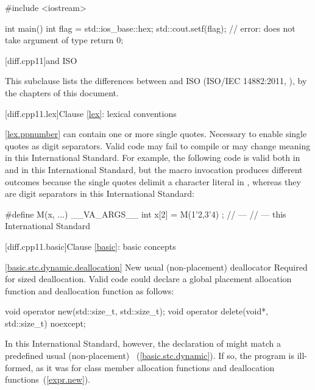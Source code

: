 \begin{codeblock}
#include <iostream>

int main() {
  int flag = std::ios_base::hex;
  std::cout.setf(flag);         // error:  does not take argument of type 
  return 0;
}
\end{codeblock}

[diff.cpp11]{\Cpp and ISO \CppXI}

\pnum
{}%
This subclause lists the differences between \Cpp and
ISO \CppXI (ISO/IEC 14882:2011, ),
by the chapters of this document.

[diff.cpp11.lex]{Clause \ref{lex}: lexical conventions}

\ref{lex.ppnumber}
\change {} can contain one or more single quotes.
\rationale Necessary to enable single quotes as digit separators.
\effect Valid \CppXI code may fail to compile or may change meaning in this
International Standard. For example, the following code is valid both in \CppXI and in
this International Standard, but the macro invocation produces different outcomes
because the single quotes delimit a character literal in \CppXI, whereas they are digit
separators in this International Standard:

\begin{codeblock}
#define M(x, ...) __VA_ARGS__
int x[2] = { M(1'2,3'4) };
//  --- \CppXI
//  --- this International Standard
\end{codeblock}

[diff.cpp11.basic]{Clause \ref{basic}: basic concepts}

\ref{basic.stc.dynamic.deallocation}
\change New usual (non-placement) deallocator 
\rationale Required for sized deallocation.
\effect Valid \CppXI code could declare a global placement allocation function and
deallocation function as follows:

\begin{codeblock}
void operator new(std::size_t, std::size_t);
void operator delete(void*, std::size_t) noexcept;
\end{codeblock}

In this International Standard, however, the declaration of 
might match a predefined usual (non-placement)
~(\ref{basic.stc.dynamic}). If so, the
program is ill-formed, as it was for class member allocation functions and
deallocation functions~(\ref{expr.new}).

